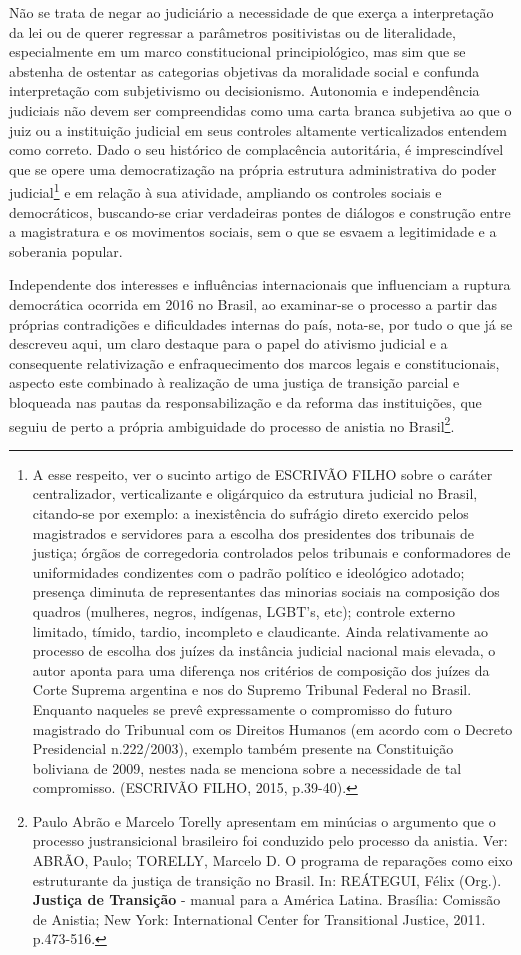 Não se trata de negar ao judiciário a necessidade de que exerça a
interpretação da lei ou de querer regressar a parâmetros positivistas ou
de literalidade, especialmente em um marco constitucional
principiológico, mas sim que se abstenha de ostentar as categorias
objetivas da moralidade social e confunda interpretação com subjetivismo
ou decisionismo. Autonomia e independência judiciais não devem ser
compreendidas como uma carta branca subjetiva ao que o juiz ou a
instituição judicial em seus controles altamente verticalizados entendem
como correto. Dado o seu histórico de complacência autoritária, é
imprescindível que se opere uma democratização na própria estrutura
administrativa do poder judicial\footnote{A esse respeito, ver o sucinto
  artigo de ESCRIVÃO FILHO sobre o caráter centralizador, verticalizante
  e oligárquico da estrutura judicial no Brasil, citando-se por exemplo:
  a inexistência do sufrágio direto exercido pelos magistrados e
  servidores para a escolha dos presidentes dos tribunais de justiça;
  órgãos de corregedoria controlados pelos tribunais e conformadores de
  uniformidades condizentes com o padrão político e ideológico adotado;
  presença diminuta de representantes das minorias sociais na composição
  dos quadros (mulheres, negros, indígenas, LGBT's, etc); controle
  externo limitado, tímido, tardio, incompleto e claudicante. Ainda
  relativamente ao processo de escolha dos juízes da instância judicial
  nacional mais elevada, o autor aponta para uma diferença nos critérios
  de composição dos juízes da Corte Suprema argentina e nos do Supremo
  Tribunal Federal no Brasil. Enquanto naqueles se prevê expressamente o
  compromisso do futuro magistrado do Tribunual com os Direitos Humanos
  (em acordo com o Decreto Presidencial n.222/2003), exemplo também
  presente na Constituição boliviana de 2009, nestes nada se menciona
  sobre a necessidade de tal compromisso. (ESCRIVÃO FILHO, 2015,
  p.39-40).} e em relação à sua atividade, ampliando os controles
sociais e democráticos, buscando-se criar verdadeiras pontes de diálogos
e construção entre a magistratura e os movimentos sociais, sem o que se
esvaem a legitimidade e a soberania popular.

Independente dos interesses e influências internacionais que influenciam
a ruptura democrática ocorrida em 2016 no Brasil, ao examinar-se o
processo a partir das próprias contradições e dificuldades internas do
país, nota-se, por tudo o que já se descreveu aqui, um claro destaque
para o papel do ativismo judicial e a consequente relativização e
enfraquecimento dos marcos legais e constitucionais, aspecto este
combinado à realização de uma justiça de transição parcial e bloqueada
nas pautas da responsabilização e da reforma das instituições, que
seguiu de perto a própria ambiguidade do processo de anistia no
Brasil\footnote{Paulo Abrão e Marcelo Torelly apresentam em minúcias o
  argumento que o processo justransicional brasileiro foi conduzido pelo
  processo da anistia. Ver: ABRÃO, Paulo; TORELLY, Marcelo D. O programa
  de reparações como eixo estruturante da justiça de transição no
  Brasil. In: REÁTEGUI, Félix (Org.). \textbf{Justiça de Transição} -
  manual para a América Latina. Brasília: Comissão de Anistia; New York:
  International Center for Transitional Justice, 2011. p.473-516.}.

